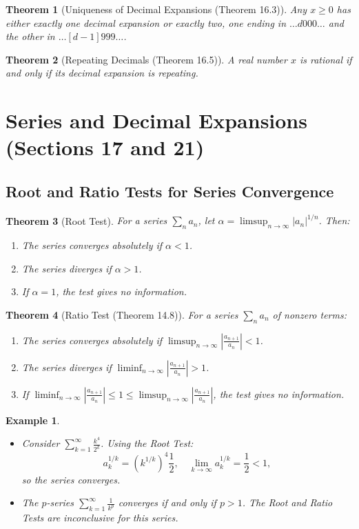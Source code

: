 \documentclass[9pt]{article}
\theoremstyle{definition}
\theoremstyle{plain}
\newtheorem{theorem}{Theorem}
\newtheorem{example}{Example}
\begin{document}
\begin{theorem}[Uniqueness of Decimal Expansions (Theorem 16.3)]
Any \( x \geq 0 \) has either exactly one decimal expansion or exactly two, one ending in \( \ldots d000\ldots \) and the other in \( \ldots [d-1]999\ldots \).
\end{theorem}

\begin{theorem}[Repeating Decimals (Theorem 16.5)]
A real number \( x \) is rational if and only if its decimal expansion is repeating.
\end{theorem}
\section*{Series and Decimal Expansions (Sections 17 and 21)}

\subsection*{Root and Ratio Tests for Series Convergence}
\begin{theorem}[Root Test]
For a series \( \sum_{n} a_n \), let \( \alpha = \limsup_{n \to \infty} |a_n|^{1/n} \). Then:
\begin{enumerate}
    \item The series converges absolutely if \( \alpha < 1 \).
    \item The series diverges if \( \alpha > 1 \).
    \item If \( \alpha = 1 \), the test gives no information.
\end{enumerate}
\end{theorem}

\begin{theorem}[Ratio Test (Theorem 14.8)]
For a series \( \sum_{n} a_n \) of nonzero terms:
\begin{enumerate}
    \item The series converges absolutely if \( \limsup_{n \to \infty} \left| \frac{a_{n+1}}{a_n} \right| < 1 \).
    \item The series diverges if \( \liminf_{n \to \infty} \left| \frac{a_{n+1}}{a_n} \right| > 1 \).
    \item If \( \liminf_{n \to \infty} \left| \frac{a_{n+1}}{a_n} \right| \leq 1 \leq \limsup_{n \to \infty} \left| \frac{a_{n+1}}{a_n} \right| \), the test gives no information.
\end{enumerate}
\end{theorem}

\begin{example}
\leavevmode
\begin{itemize}
    \item Consider \( \sum_{k=1}^\infty \frac{k^4}{2^k} \). Using the Root Test:
    \[
    a_k^{1/k} = \left( k^{1/k} \right)^4 \frac{1}{2}, \quad \lim_{k \to \infty} a_k^{1/k} = \frac{1}{2} < 1,
    \]
    so the series converges.
    \item The \( p \)-series \( \sum_{k=1}^\infty \frac{1}{k^p} \) converges if and only if \( p > 1 \). The Root and Ratio Tests are inconclusive for this series.
\end{itemize}
\end{example}
\end{document}
